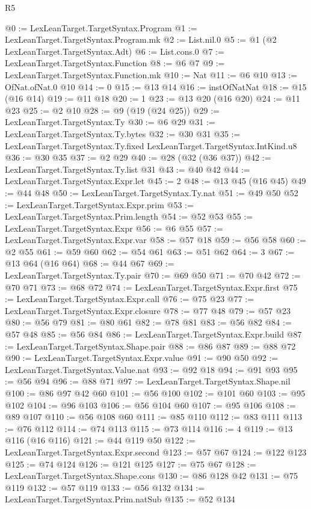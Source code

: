 \begin{lexlean}{R5}
\begin{coremodule}
@0 := LexLeanTarget.TargetSyntax.Program
@1 := LexLeanTarget.TargetSyntax.Program.mk
@2 := List.nil.{0}
@5 := @1 (@2 LexLeanTarget.TargetSyntax.Adt)
@6 := List.cons.{0}
@7 := LexLeanTarget.TargetSyntax.Function
@8 := @6 @7
@9 := LexLeanTarget.TargetSyntax.Function.mk
@10 := Nat
@11 := @6 @10
@13 := OfNat.ofNat.{0} @10
@14 := 0
@15 := @13 @14
@16 := instOfNatNat
@18 := @15 (@16 @14)
@19 := @11 @18
@20 := 1
@23 := @13 @20 (@16 @20)
@24 := @11 @23
@25 := @2 @10
@28 := @9 (@19 (@24 @25))
@29 := LexLeanTarget.TargetSyntax.Ty
@30 := @6 @29
@31 := LexLeanTarget.TargetSyntax.Ty.bytes
@32 := @30 @31
@35 := LexLeanTarget.TargetSyntax.Ty.fixed LexLeanTarget.TargetSyntax.IntKind.u8
@36 := @30 @35
@37 := @2 @29
@40 := @28 (@32 (@36 @37))
@42 := LexLeanTarget.TargetSyntax.Ty.list @31
@43 := @40 @42
@44 := LexLeanTarget.TargetSyntax.Expr.let
@45 := 2
@48 := @13 @45 (@16 @45)
@49 := @44 @48
@50 := LexLeanTarget.TargetSyntax.Ty.nat
@51 := @49 @50
@52 := LexLeanTarget.TargetSyntax.Expr.prim
@53 := LexLeanTarget.TargetSyntax.Prim.length
@54 := @52 @53
@55 := LexLeanTarget.TargetSyntax.Expr
@56 := @6 @55
@57 := LexLeanTarget.TargetSyntax.Expr.var
@58 := @57 @18
@59 := @56 @58
@60 := @2 @55
@61 := @59 @60
@62 := @54 @61
@63 := @51 @62
@64 := 3
@67 := @13 @64 (@16 @64)
@68 := @44 @67
@69 := LexLeanTarget.TargetSyntax.Ty.pair
@70 := @69 @50
@71 := @70 @42
@72 := @70 @71
@73 := @68 @72
@74 := LexLeanTarget.TargetSyntax.Expr.first
@75 := LexLeanTarget.TargetSyntax.Expr.call
@76 := @75 @23
@77 := LexLeanTarget.TargetSyntax.Expr.closure
@78 := @77 @48
@79 := @57 @23
@80 := @56 @79
@81 := @80 @61
@82 := @78 @81
@83 := @56 @82
@84 := @57 @48
@85 := @56 @84
@86 := LexLeanTarget.TargetSyntax.Expr.build
@87 := LexLeanTarget.TargetSyntax.Shape.pair
@88 := @86 @87
@89 := @88 @72
@90 := LexLeanTarget.TargetSyntax.Expr.value
@91 := @90 @50
@92 := LexLeanTarget.TargetSyntax.Value.nat
@93 := @92 @18
@94 := @91 @93
@95 := @56 @94
@96 := @88 @71
@97 := LexLeanTarget.TargetSyntax.Shape.nil
@100 := @86 @97 @42 @60
@101 := @56 @100
@102 := @101 @60
@103 := @95 @102
@104 := @96 @103
@106 := @56 @104 @60
@107 := @95 @106
@108 := @89 @107
@110 := @56 @108 @60
@111 := @85 @110
@112 := @83 @111
@113 := @76 @112
@114 := @74 @113
@115 := @73 @114
@116 := 4
@119 := @13 @116 (@16 @116)
@121 := @44 @119 @50
@122 := LexLeanTarget.TargetSyntax.Expr.second
@123 := @57 @67
@124 := @122 @123
@125 := @74 @124
@126 := @121 @125
@127 := @75 @67
@128 := LexLeanTarget.TargetSyntax.Shape.cons
@130 := @86 @128 @42
@131 := @75 @119
@132 := @57 @119
@133 := @56 @132
@134 := LexLeanTarget.TargetSyntax.Prim.natSub
@135 := @52 @134

\end{coremodule}
\end{lexlean}
